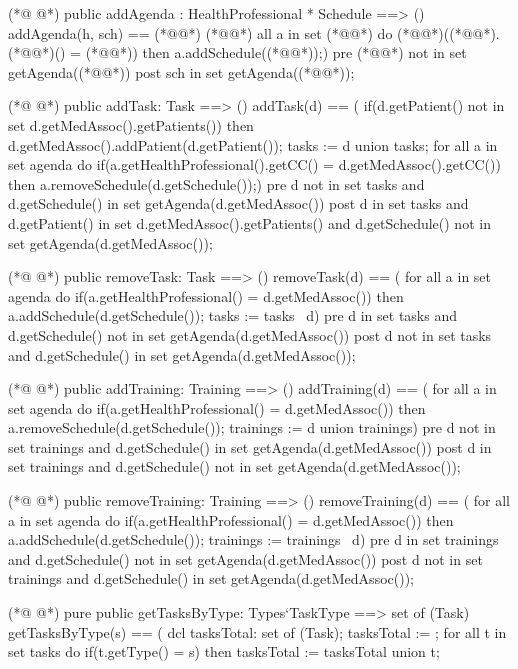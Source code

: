 \begin{vdmpp}[breaklines=true]
(*@
\label{addAgenda:68}
@*)
 public addAgenda : HealthProfessional * Schedule ==> ()
  addAgenda(h, sch) == (*@\vdmnotcovered{(}@*)
   (*@@*) all a in set (*@@*) do
    (*@@*)((*@@*).(*@@*)() = (*@@*))
     then a.addSchedule((*@@*));)
 pre (*@@*) not in set getAgenda((*@@*))
 post sch in set getAgenda((*@@*));
 
(*@
\label{addTask:76}
@*)
 public addTask: Task ==> ()
  addTask(d) == (
   if(d.getPatient() not in set d.getMedAssoc().getPatients())
    then d.getMedAssoc().addPatient(d.getPatient());
   tasks := {d} union tasks;
   for all a in set agenda do
    if(a.getHealthProfessional().getCC() = d.getMedAssoc().getCC())
      then a.removeSchedule(d.getSchedule());)
 pre d not in set tasks and d.getSchedule() in set getAgenda(d.getMedAssoc())
 post d in set tasks and d.getPatient() in set d.getMedAssoc().getPatients() and d.getSchedule() not in set getAgenda(d.getMedAssoc());
  
(*@
\label{removeTask:87}
@*)
 public removeTask: Task ==> ()
  removeTask(d) == (
   for all a in set agenda do
    if(a.getHealthProfessional() = d.getMedAssoc())
      then a.addSchedule(d.getSchedule());
   tasks := tasks \ {d})
 pre d in set tasks and d.getSchedule() not in set getAgenda(d.getMedAssoc())
 post d not in set tasks and d.getSchedule() in set getAgenda(d.getMedAssoc());
 
(*@
\label{addTraining:96}
@*)
 public addTraining: Training ==> ()
  addTraining(d) == (
   for all a in set agenda do
    if(a.getHealthProfessional() = d.getMedAssoc())
      then a.removeSchedule(d.getSchedule());
   trainings := {d} union trainings)
 pre d not in set trainings and d.getSchedule() in set getAgenda(d.getMedAssoc())
 post d in set trainings and d.getSchedule() not in set getAgenda(d.getMedAssoc());
  
(*@
\label{removeTraining:105}
@*)
 public removeTraining: Training ==> ()
  removeTraining(d) == (
   for all a in set agenda do
    if(a.getHealthProfessional() = d.getMedAssoc())
      then a.addSchedule(d.getSchedule());
   trainings := trainings \ {d})
 pre d in set trainings and d.getSchedule() not in set getAgenda(d.getMedAssoc())
 post d not in set trainings and d.getSchedule() in set getAgenda(d.getMedAssoc());
 
(*@
\label{getTasksByType:114}
@*)
 pure public getTasksByType: Types`TaskType ==> set of (Task)
  getTasksByType(s) == (
   dcl tasksTotal: set of (Task);
   tasksTotal := {};
   for all t in set tasks do
    if(t.getType() = s)
     then tasksTotal := tasksTotal union {t};
     

\end{vdmpp}
